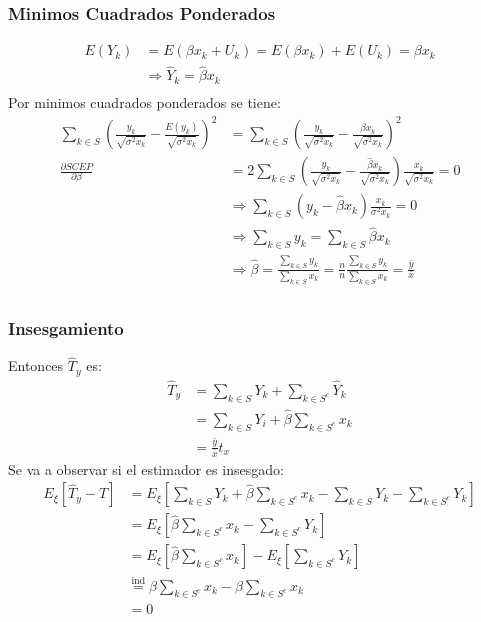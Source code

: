 ﻿\documentclass{beamer}
\begin{document}
\begin{frame}[allowframebreaks*]
\frametitle{Minimos Cuadrados Ponderados}
{\footnotesize
\begin{align*}
E(Y_k)&=E(\beta x_k+U_k)=E(\beta x_k)+E(U_k)=\beta x_k\\
&\Rightarrow \hat Y_k=\hat\beta x_k\\
\end{align*}
Por minimos cuadrados ponderados se tiene:
\begin{align*}
\sum\limits_{k \in S}\left(\frac{y_k}{\sqrt{\sigma^2x_k}}-\frac{E(y_k)}{\sqrt{\sigma^2x_k}}\right)^2&=\sum\limits_{k \in S}\left(\frac{y_k}{\sqrt{\sigma^2x_k}} -\frac{\beta x_k}{\sqrt{\sigma^2x_k}}\right)^2\\
\frac{\partial SCEP}{\partial \beta}&=2\sum\limits_{k \in S}\left(\frac{y_k}{\sqrt{\sigma^2x_k}}-\frac{\hat\beta x_k}{\sqrt{\sigma^2x_k}}\right)\frac{x_k}{\sqrt{\sigma^2x_k}}=0\\
&\Rightarrow \sum\limits_{k \in S}(y_k-\hat\beta x_k)\frac{x_k}{\sigma^2x_k}=0\\
&\Rightarrow \sum\limits_{k \in S} y_k=\sum\limits_{k \in S}\hat\beta x_k\\
&\Rightarrow \hat\beta=\frac{\sum\limits_{k \in S} y_k}{\sum\limits_{k \in S} x_k}=\frac{n}{n}\frac{\sum\limits_{k \in S} y_k}{\sum\limits_{k \in S} x_k}=\frac{\bar y}{\bar x}\\
\end{align*}}
\end{frame}

\begin{frame}[allowframebreaks*]
\frametitle{Insesgamiento}
{\footnotesize
Entonces $\hat T_y$ es:
\begin{align*}
\hat T_y &=\sum\limits_{k\in S}Y_k+\sum\limits_{k\in S^c}\hat Y_k\\
&=\sum\limits_{k\in S}Y_i+\hat\beta\sum\limits_{k\in S^c}x_k\\
&=\frac{\bar y}{\bar x}t_x
\end{align*}
Se va a observar si el estimador es insesgado:
\begin{align*}
E_{\xi}[\hat T_y-T]&=E_{\xi}\left[\sum\limits_{k\in S}Y_k+\hat\beta\sum\limits_{k\in S^c}x_k-\sum\limits_{k\in S}Y_k-\sum\limits_{k\in S^c}Y_k\right]\\
&=E_{\xi}\left[\hat\beta\sum\limits_{k\in S^c}x_k-\sum\limits_{k\in S^c}Y_k\right]\\
&=E_{\xi}\left[\hat\beta\sum\limits_{k\in S^c}x_k\right]-E_{\xi}\left[\sum\limits_{k\in S^c}Y_k\right]\\
&\stackrel{\text{ind}}{=}\beta\sum\limits_{k\in S^c}x_k-\beta\sum\limits_{k\in S^c}x_k\\
&=0
\end{align*}
}
\end{frame}
\end{document}
